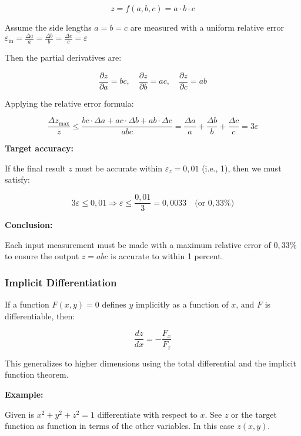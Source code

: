 \[
    z = f(a, b, c) = a \cdot b \cdot c
\]

Assume the side lengths \( a = b = c \) are measured with a uniform relative error 
\( \varepsilon_{\text{in}} = \frac{\Delta a}{a} = \frac{\Delta b}{b} = \frac{\Delta c}{c} = \varepsilon \)
\vspace{\baselineskip}

Then the partial derivatives are:

\[
    \frac{\partial z}{\partial a} = b c, \quad
    \frac{\partial z}{\partial b} = a c, \quad
    \frac{\partial z}{\partial c} = a b
\]

Applying the relative error formula:

\[
    \frac{\Delta z_{\max}}{z} \leq \frac{bc \cdot \Delta a + ac \cdot \Delta b + ab \cdot \Delta c}{abc}
    = \frac{\Delta a}{a} + \frac{\Delta b}{b} + \frac{\Delta c}{c} = 3 \varepsilon
\]

\textbf{Target accuracy:}  

If the final result \( z \) must be accurate within \( \varepsilon_z = 0{,}01 \) (i.e., 1), then we must 
satisfy:

\[
    3 \varepsilon \leq 0{,}01 \Rightarrow \varepsilon \leq \frac{0{,}01}{3} = \boxed{0{,}0033} \quad 
    \text{(or } 0{,}33\% \text{)}
\]

\textbf{Conclusion:}
\vspace{\baselineskip}

Each input measurement must be made with a maximum relative error of \( \boxed{0{,}33\%} \) to ensure 
the output \( z = abc \) is accurate to within 1 percent.

\subsubsection{Implicit Differentiation}

If a function \( F(x, y) = 0 \) defines \( y \) implicitly as a function of \( x \), and \( F \) is 
differentiable, then:

\[
    \frac{dz}{dx} = -\frac{F_x}{F_z}
\]

This generalizes to higher dimensions using the total differential and the implicit function theorem.
\vspace{\baselineskip}

\textbf{Example:}
\vspace{\baselineskip}

Given is \(x^2 + y^2 + z^2 = 1\) differentiate with respect to \(x\).
See \(z\) or the target function as function in terms of the other variables. 
In this case \(z(x,y)\).

